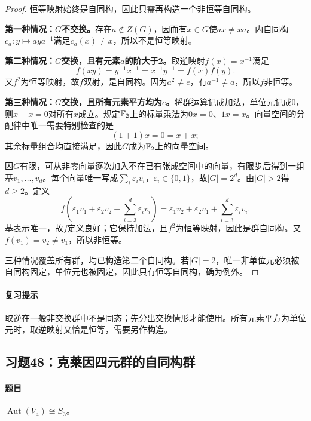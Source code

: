 \documentclass[UTF8,a4paper,11pt,fontset=windows]{ctexart}
\DeclareMathOperator{\Aut}{Aut}\DeclareMathOperator{\Inn}{Inn}
\newcommand{\exref}[2]{\hyperref[ex:#1:#2]{第#1章习题#2}}
\begin{document}

\begin{proof}
恒等映射始终是自同构，因此只需再构造一个非恒等自同构。

\textbf{第一种情况：$G$不交换。}存在$a\notin Z(G)$，因而有$x\in G$使$ax\ne xa$。内自同构$c_a:y\mapsto aya^{-1}$满足$c_a(x)\ne x$，所以不是恒等映射。

\textbf{第二种情况：$G$交换，且有元素$a$的阶大于2。}取逆映射$f(x)=x^{-1}$满足
\[
f(xy)=y^{-1}x^{-1}=x^{-1}y^{-1}=f(x)f(y).
\]
又$f^2$为恒等映射，故$f$双射，是自同构。因为$a^2\ne e$，有$a^{-1}\ne a$，所以$f$非恒等。

\textbf{第三种情况：$G$交换，且所有元素平方均为$e$。}将群运算记成加法，单位元记成0，则$x+x=0$对所有$x$成立。规定$\mathbb F_2$上的标量乘法为$0x=0$、$1x=x$。向量空间的分配律中唯一需要特别检查的是
\[
(1+1)x=0=x+x;
\]
其余标量组合均直接满足，因此$G$成为$\mathbb F_2$上的向量空间。

因$G$有限，可从非零向量逐次加入不在已有张成空间中的向量，有限步后得到一组基$v_1,\ldots,v_d$。每个向量唯一写成$\sum_i\varepsilon_iv_i$，$\varepsilon_i\in\{0,1\}$，故$|G|=2^d$。由$|G|>2$得$d\ge2$。定义
\[
f\left(\varepsilon_1v_1+\varepsilon_2v_2+\sum_{i=3}^d\varepsilon_iv_i\right)
=\varepsilon_1v_2+\varepsilon_2v_1+\sum_{i=3}^d\varepsilon_iv_i.
\]
基表示唯一，故$f$定义良好；它保持加法，且$f^2$为恒等映射，因此是群自同构。又$f(v_1)=v_2\ne v_1$，所以非恒等。

三种情况覆盖所有群，均已构造第二个自同构。若$|G|=2$，唯一非单位元必须被自同构固定，单位元也被固定，因此只有恒等自同构，确为例外。
\end{proof}

\paragraph{复习提示}
取逆在一般非交换群中不是同态；先分出交换情形才能使用。所有元素平方为单位元时，取逆映射又恰是恒等，需要另作构造。


\subsection{习题48：\texorpdfstring{克莱因四元群的自同构群}{克莱因四元群的自同构群}}
\label{ex:2:48}

\paragraph{题目}
$\Aut(V_4)\cong S_3$。
\end{document}
